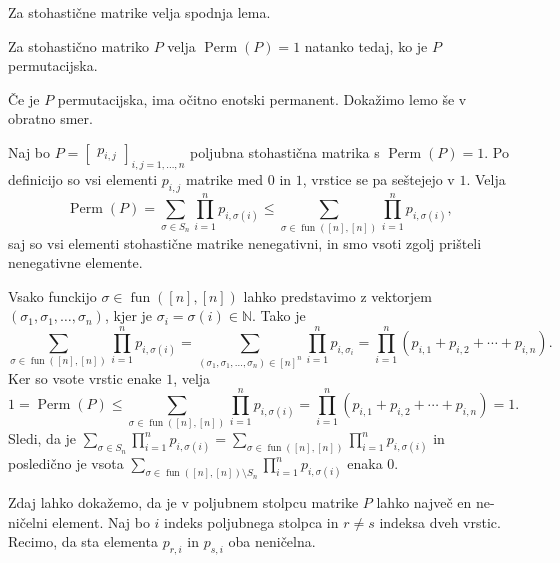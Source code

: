 \documentclass[mat2, tisk]{fmfdelo}
\newcommand{\N}{\mathbb N}
\newcommand{\fun}{\operatorname{fun}}
\newcommand{\funnn}[1]{\fun([#1], [#1])}
\begin{document}
            Za stohastične matrike velja spodnja lema.
            \begin{lema}
              Za stohastično matriko $P$ velja
              $\operatorname{Perm}(P)=1$ natanko tedaj, ko je $P$ permutacijska.
            \end{lema}
            \begin{dokaz}
              Če je $P$ permutacijska, ima očitno enotski permanent.
              Dokažimo lemo še v obratno smer.

              Naj bo $P =
              \begin{bmatrix}
                p_{i,j}
              \end{bmatrix}_{i,j=1,\dotsc, n}$ poljubna stohastična
              matrika s $\operatorname{Perm}(P) = 1$. Po definicijo
              so vsi elementi  $p_{i,j}$ matrike med $0$ in $1$,
              vrstice se pa seštejejo v $1$.
              Velja
              $$
              \operatorname{Perm}(P) = \sum_{\sigma  \in S_n}
              \prod_{i=1}^n p_{i, \sigma(i)} \leq \sum_{\sigma  \in
              \funnn{n}} \prod_{i=1}^n p_{i, \sigma(i)},
              $$
              saj so vsi elementi stohastične matrike nenegativni, in
              smo vsoti zgolj prišteli nenegativne elemente.

              Vsako funckijo $\sigma \in \funnn{n}$ lahko predstavimo
              z vektorjem $(\sigma_1, \sigma_1, \dotsc, \sigma_n)$,
              kjer je $\sigma_i = \sigma(i) \in \N$. Tako je
              $$
              \sum_{\sigma  \in \funnn{n}} \prod_{i=1}^n p_{i, \sigma(i)} =
              \sum_{(\sigma_1, \sigma_1, \dotsc, \sigma_n) \in [n]^n}
              \prod_{i=1}^n p_{i, \sigma_i} =
              \prod_{i=1}^n (p_{i, 1} + p_{i, 2} + \dotsm + p_{i, n}).
              $$
              Ker so vsote vrstic enake $1$, velja
              $$
              1 = \operatorname{Perm}(P) \leq  \sum_{\sigma  \in
              \funnn{n}} \prod_{i=1}^n p_{i, \sigma(i)} =
              \prod_{i=1}^n (p_{i, 1} + p_{i, 2} + \dotsm + p_{i, n}) = 1.
              $$
              Sledi, da je  $\sum_{\sigma  \in S_n}  \prod_{i=1}^n
              p_{i, \sigma(i)} =  \sum_{\sigma  \in \funnn{n}}
              \prod_{i=1}^n p_{i, \sigma(i)} $ in posledično je vsota
              $
              \sum_{\sigma  \in \funnn{n} \setminus S_n}
              \prod_{i=1}^n p_{i, \sigma(i)}
              $ enaka $0$.

              Zdaj lahko dokažemo, da je  v poljubnem stolpcu matrike
              $P$ lahko največ en ne-ničelni element. Naj bo $i$
              indeks poljubnega stolpca in $r \neq s$ indeksa dveh
              vrstic. Recimo, da sta elementa $p_{r, i}$ in $p_{s,i}$
              oba neničelna.


\end{dokaz}
\end{document}
